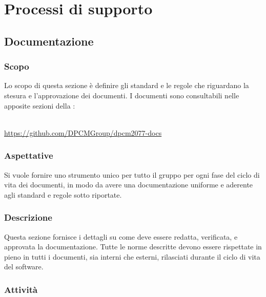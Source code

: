 \section{Processi di supporto}
	\subsection{Documentazione}
		\subsubsection{Scopo}
			Lo scopo di questa sezione è definire gli standard e le regole che riguardano la stesura e l'approvazione dei documenti.
			I documenti sono consultabili nelle apposite sezioni della :\\
			\\
			\centerline{\url{https://github.com/DPCMGroup/dpcm2077-docs}}
		\subsubsection{Aspettative}
			Si vuole fornire uno strumento unico per tutto il gruppo per ogni fase del ciclo di vita dei documenti, in modo da avere una documentazione uniforme e aderente agli standard e regole sotto riportate.
		\subsubsection{Descrizione}
			Questa sezione fornisce i dettagli su come deve essere redatta, verificata, e approvata la documentazione. Tutte le norme descritte devono essere rispettate in pieno in tutti i documenti, sia interni che esterni, rilasciati durante il ciclo di vita del software.
		\subsubsection{Attività}
